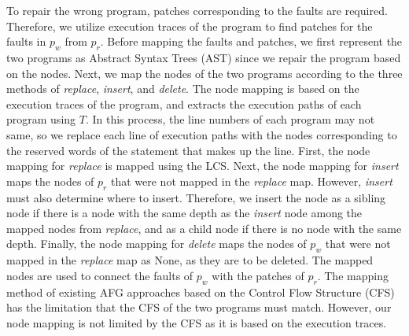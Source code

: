 \documentclass[10pt,conference]{IEEEtran}
\begin{document}
        To repair the wrong program, patches corresponding to the faults are required. Therefore, we utilize execution traces of the program to find patches for the faults in $p_{w}$ from $p_{r}$. Before mapping the faults and patches, we first represent the two programs as Abstract Syntax Trees (AST) since we repair the program based on the nodes. Next, we map the nodes of the two programs according to the three methods of \textit{replace}, \textit{insert}, and \textit{delete}. The node mapping is based on the execution traces of the program, and extracts the execution paths of each program using $T$. In this process, the line numbers of each program may not same, so we replace each line of execution paths with the nodes corresponding to the reserved words of the statement that makes up the line. First, the node mapping for \textit{replace} is mapped using the LCS. Next, the node mapping for \textit{insert} maps the nodes of $p_{r}$ that were not mapped in the \textit{replace} map. However, \textit{insert} must also determine where to insert. Therefore, we insert the node as a sibling node if there is a node with the same depth as the \textit{insert} node among the mapped nodes from \textit{replace}, and as a child node if there is no node with the same depth. Finally, the node mapping for \textit{delete} maps the nodes of $p_{w}$ that were not mapped in the \textit{replace} map as None, as they are to be deleted. The mapped nodes are used to connect the faults of $p_{w}$ with the patches of $p_{r}$. The mapping method of existing AFG approaches \cite{gulwani2018automated, wang2018search,hu2019re} based on the Control Flow Structure (CFS) has the limitation that the CFS of the two programs must match. However, our node mapping is not limited by the CFS as it is based on the execution traces.
        
\end{document}

